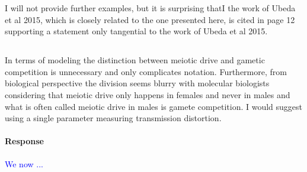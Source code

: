 \documentclass[10pt,letterpaper]{article}
\begin{document}
I will not provide further examples, but it is surprising thatI the work of Ubeda et al 2015, which is closely related to the one presented here, is cited in page 12 supporting a statement only tangential to the work of Ubeda et al 2015.

\noindent\subsection{}
In terms of modeling the distinction between meiotic drive and gametic competition is unnecessary and only complicates notation. Furthermore, from biological perspective the division seems blurry with molecular biologists considering that meiotic drive only happens in females and never in males and what is often called meiotic drive in males is gamete competition. I would suggest using a single parameter measuring transmission distortion.

\noindent\paragraph{Response}
\textcolor{blue}{We now ...}
\end{document}
